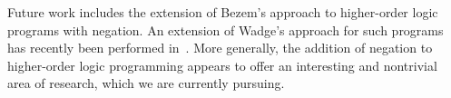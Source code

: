 \documentclass[submission,copyright]{eptcs}
\theoremstyle{definition}
\begin{document}
Future work includes the extension of Bezem's approach to higher-order logic programs
with negation. An extension of Wadge's approach for such programs has recently
been performed in~\cite{CharalambidisER14}. More generally, the addition of negation
to higher-order logic programming appears to offer an interesting and nontrivial
area of research, which we are currently pursuing.




\appendix
\end{document}
